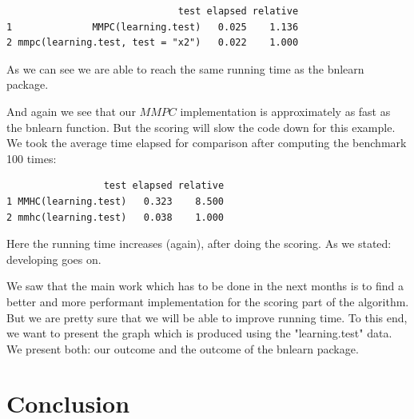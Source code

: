 	\begin{program}
		\begin{snugshade}
  			\begin{verbatim}
                              test elapsed relative
1              MMPC(learning.test)   0.025    1.136
2 mmpc(learning.test, test = "x2")   0.022    1.000
			\end{verbatim}
 		\end{snugshade}
		\caption{As we can see we are able to reach the same running time as the bnlearn package.}
 	\end{program}

 	And again we see that our $MMPC$ implementation is approximately as fast as the bnlearn function. But the scoring will slow the code down for this example. We took the average time elapsed for comparison after computing the benchmark 100 times:

	\begin{program}
		\begin{snugshade}
  			\begin{verbatim}
                 test elapsed relative
1 MMHC(learning.test)   0.323    8.500
2 mmhc(learning.test)   0.038    1.000
			\end{verbatim}
 		\end{snugshade}
		\caption{Here the running time increases (again), after doing the scoring. As we stated: developing goes on.}
 	\end{program}

 	We saw that the main work which has to be done in the next months is to find a better and more performant implementation for the scoring part of the algorithm. But we are pretty sure that we will be able to improve running time. To this end, we want to present the graph which is produced using the "learning.test" data. We present both: our outcome and the outcome of the bnlearn package.



\chapter{Conclusion}


